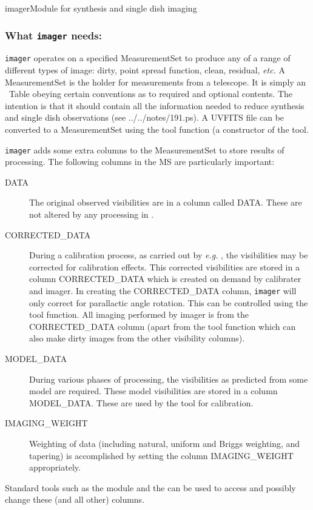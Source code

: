 \begin{ahmodule}{imager}{Module for synthesis and single dish imaging}
\subsubsection*{What {\tt imager} needs:}

{\tt imager} operates on a specified MeasurementSet to produce any of a
range of different types of image: dirty, point spread function,
clean, residual, {\em etc.}  A MeasurementSet is the holder for
measurements from a telescope. It is simply an \aipspp\ Table obeying
certain conventions as to required and optional contents. The
intention is that it should contain all the information needed to
reduce synthesis and single dish observations (see
 {../../notes/191.ps}). A
UVFITS file can be converted to a MeasurementSet using the
 tool function (a constructor of the
 tool.

{\tt imager} adds some extra columns to the MeasurementSet to store
results of processing. The following columns in the MS are
particularly important:
\begin{description}
\item[DATA] The original observed visibilities are in a column
called DATA. These are not altered by any processing in \aipspp.
\item[CORRECTED\_DATA] During a calibration process, as carried out by
{\em e.g.} , the visibilities may be corrected for
calibration effects. This corrected visibilities are stored in a column
CORRECTED\_DATA which is created on demand by calibrater and imager. In creating
the CORRECTED\_DATA column, {\tt imager} will only correct for parallactic
angle rotation. This can be controlled using the
 tool function. All imaging performed by
imager is from the CORRECTED\_DATA column (apart from the
tool function  which can also make dirty
images from the other visibility columns).
\item[MODEL\_DATA] During various phases of processing, the
visibilities as predicted from some model are required. These 
model visibilities are stored in a column MODEL\_DATA. 
These are used by the  tool for 
calibration.
\item[IMAGING\_WEIGHT] Weighting of data (including natural,
uniform and Briggs weighting,
and tapering) is accomplished by setting the column IMAGING\_WEIGHT
appropriately. 
\end{description}
Standard tools such as the 
module and the  can be used to access and possibly
change these (and all other) columns.


\end{ahmodule}
